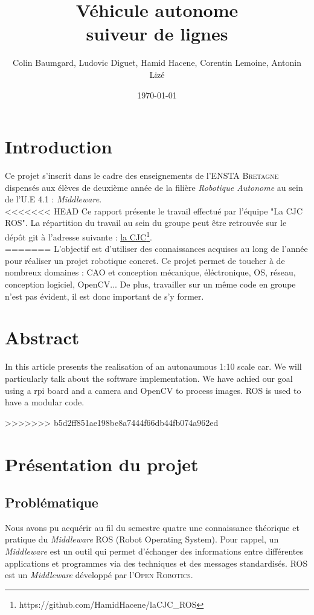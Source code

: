 \documentclass[12pt, openany]{report}
\title{Véhicule autonome \\ suiveur de lignes}
\author{Colin Baumgard, Ludovic Diguet, Hamid Hacene, Corentin Lemoine, Antonin Lizé}
\date{\today}
\begin{document}
\maketitle
\tableofcontents
\pagebreak

\section*{Introduction} 
Ce projet s'inscrit dans le cadre des enseignements de l'\textsc{ENSTA Bretagne} dispensés aux élèves de deuxième année de la filière \textit{Robotique Autonome} au sein de l'U.E 4.1 : \textit{Middleware}.\\

<<<<<<< HEAD
Ce rapport présente le travail effectué par l’équipe "La CJC ROS". La répartition du travail au sein du groupe peut être retrouvée sur le dépôt git à l’adresse suivante : \href{https://github.com/HamidHacene/laCJC_ROS}{la CJC}\footnote{https://github.com/HamidHacene/laCJC\_ROS}.\\
=======
L'objectif est d'utiliser des connaissances acquises au long de l'année pour réaliser un projet robotique concret. Ce projet permet de toucher à de nombreux domaines : CAO et conception mécanique, éléctronique, OS, réseau, conception logiciel, OpenCV... De plus, travailler sur un même code en groupe  n'est pas évident, il est donc important de s'y former.

\section*{Abstract}
In this article presents the realisation of an autonaumous 1:10 scale car. We will particularly talk about the software implementation. We have achied our goal using a rpi board and a camera and OpenCV to process images. ROS is used to have a modular code.

\pagebreak
>>>>>>> b5d2ff851ae198be8a7444f66db44fb074a962ed

\section{Présentation du projet}
\subsection{Problématique}
Nous avons pu acquérir au fil du semestre quatre une connaissance théorique et pratique du \textit{Middleware} \textsc{ROS} (Robot Operating System). Pour rappel, un \textit{Middleware} est un outil qui permet d'échanger des informations entre différentes applications et programmes via des techniques et des messages standardisés. \textsc{ROS} est un \textit{Middleware} développé par l'\textsc{Open Robotics}.\\
\end{document}
